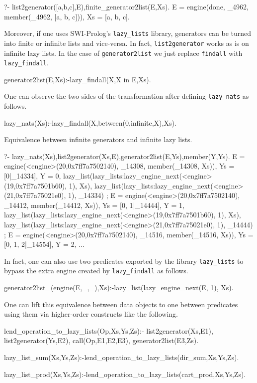 \documentclass{new_tlp}
\begin{document}
\BX
\begin{codex}
?- list2generator([a,b,c],E),finite_generator2list(E,Xs).
E = engine(done, _4962, member(_4962, [a, b, c])),
Xs = [a, b, c].
\end{codex}
\EX

Moreover, if one uses SWI-Prolog's {\tt lazy\_lists} library, generators can be turned into finite or infinite lists and vice-versa.
In fact, {\tt list2generator} works as is on infinite lazy lists. In the case of {\tt generator2list} we just replace {\tt findall} with {\tt lazy\_findall}.
\begin{code}
generator2list(E,Xs):-lazy_findall(X,X in E,Xs).
\end{code} 

One can observe the two sides of the transformation after defining {\tt lazy\_nats} as follows.
\begin{code}
lazy_nats(Xs):-lazy_findall(X,between(0,infinite,X),Xs).
\end{code}

\BX
Equivalence between infinite generators and infinite lazy lists.
\begin{codex}
?- lazy_nats(Xs),list2generator(Xs,E),generator2list(E,Ys),member(Y,Ys).
E = engine(<engine>(20,0x7ff7a7502140), _14308, member(_14308, Xs)),
Ys = [0|_14334],
Y = 0,
lazy_list(lazy_lists:lazy_engine_next(<engine>(19,0x7ff7a7501b60), 1), Xs),
lazy_list(lazy_lists:lazy_engine_next(<engine>(21,0x7ff7a75021e0), 1), _14334) ;
E = engine(<engine>(20,0x7ff7a7502140), _14412, member(_14412, Xs)),
Ys = [0, 1|_14444],
Y = 1,
lazy_list(lazy_lists:lazy_engine_next(<engine>(19,0x7ff7a7501b60), 1), Xs),
lazy_list(lazy_lists:lazy_engine_next(<engine>(21,0x7ff7a75021e0), 1), _14444) ;
E = engine(<engine>(20,0x7ff7a7502140), _14516, member(_14516, Xs)),
Ys = [0, 1, 2|_14554],
Y = 2,
...
\end{codex}
\EX
In fact, one can also use two predicates exported by the library {\tt lazy\_lists}
to bypass the extra engine created by {\tt lazy\_findall} as follows.
\begin{code}
generator2list_(engine(E,_,_),Xs):-lazy_list(lazy_engine_next(E, 1), Xs).
\end{code}

One can lift this equivalence between data objects to one between predicates using them via higher-order constructs like the following.

\begin{code}
lend_operation_to_lazy_lists(Op,Xs,Ys,Zs):-
  list2generator(Xs,E1),
  list2generator(Ys,E2),
  call(Op,E1,E2,E3),
  generator2list(E3,Zs).

lazy_list_sum(Xs,Ys,Zs):-lend_operation_to_lazy_lists(dir_sum,Xs,Ys,Zs).

lazy_list_prod(Xs,Ys,Zs):-lend_operation_to_lazy_lists(cart_prod,Xs,Ys,Zs).
\end{code}
\end{document}
